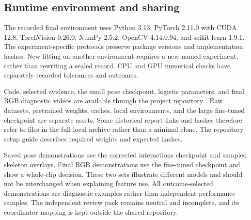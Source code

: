 \documentclass[journal]{IEEEtai}
\begin{document}
\subsection{Runtime environment and sharing}
The recorded final environment uses Python 3.13, PyTorch 2.11.0 with CUDA 12.8, TorchVision 0.26.0, NumPy 2.5.2, OpenCV 4.14.0.94, and scikit-learn 1.9.1. The experiment-specific protocols preserve package versions and implementation hashes. New fitting on another environment requires a new named experiment, rather than rewriting a sealed record. CPU and GPU numerical checks have separately recorded tolerances and outcomes.

Code, selected evidence, the small pose checkpoint, logistic parameters, and final RGB diagnostic videos are available through the project repository \cite{projectrepo}. Raw datasets, pretrained weights, caches, local environments, and the large fine-tuned checkpoint are separate assets. Some historical report links and hashes therefore refer to files in the full local archive rather than a minimal clone. The repository setup guide describes required weights and expected hashes.

Saved pose demonstrations use the corrected interactions checkpoint and sampled skeleton overlays. Final RGB demonstrations use the fine-tuned checkpoint and show a whole-clip decision. These two sets illustrate different models and should not be interchanged when explaining feature use. All outcome-selected demonstrations are diagnostic examples rather than independent performance samples. The independent review pack remains neutral and incomplete, and its coordinator mapping is kept outside the shared repository.

\end{document}
